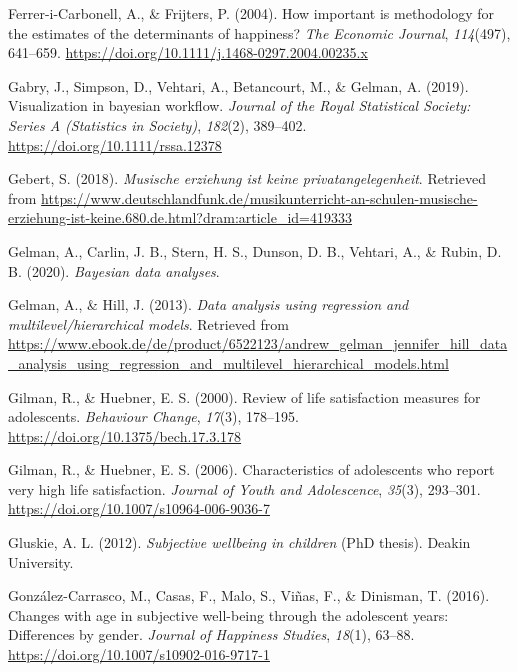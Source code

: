\documentclass[a4, 12pt]{article}
\begin{document}
\leavevmode\hypertarget{ref-iCarbonell2004}{}%
Ferrer-i-Carbonell, A., \& Frijters, P. (2004). How important is methodology for the estimates of the determinants of happiness? \emph{The Economic Journal}, \emph{114}(497), 641--659. \url{https://doi.org/10.1111/j.1468-0297.2004.00235.x}

\leavevmode\hypertarget{ref-Gabry2019}{}%
Gabry, J., Simpson, D., Vehtari, A., Betancourt, M., \& Gelman, A. (2019). Visualization in bayesian workflow. \emph{Journal of the Royal Statistical Society: Series A (Statistics in Society)}, \emph{182}(2), 389--402. \url{https://doi.org/10.1111/rssa.12378}

\leavevmode\hypertarget{ref-Gebert2018}{}%
Gebert, S. (2018). \emph{Musische erziehung ist keine privatangelegenheit}. Retrieved from \url{https://www.deutschlandfunk.de/musikunterricht-an-schulen-musische-erziehung-ist-keine.680.de.html?dram:article_id=419333}

\leavevmode\hypertarget{ref-Gelman}{}%
Gelman, A., Carlin, J. B., Stern, H. S., Dunson, D. B., Vehtari, A., \& Rubin, D. B. (2020). \emph{Bayesian data analyses}.

\leavevmode\hypertarget{ref-Gelman2013}{}%
Gelman, A., \& Hill, J. (2013). \emph{Data analysis using regression and multilevel/hierarchical models}. Retrieved from \url{https://www.ebook.de/de/product/6522123/andrew_gelman_jennifer_hill_data_analysis_using_regression_and_multilevel_hierarchical_models.html}

\leavevmode\hypertarget{ref-Gilman2000}{}%
Gilman, R., \& Huebner, E. S. (2000). Review of life satisfaction measures for adolescents. \emph{Behaviour Change}, \emph{17}(3), 178--195. \url{https://doi.org/10.1375/bech.17.3.178}

\leavevmode\hypertarget{ref-Gilman2006}{}%
Gilman, R., \& Huebner, E. S. (2006). Characteristics of adolescents who report very high life satisfaction. \emph{Journal of Youth and Adolescence}, \emph{35}(3), 293--301. \url{https://doi.org/10.1007/s10964-006-9036-7}

\leavevmode\hypertarget{ref-Gluskie2012}{}%
Gluskie, A. L. (2012). \emph{Subjective wellbeing in children} (PhD thesis). Deakin University.

\leavevmode\hypertarget{ref-GonzalezCarrasco2016}{}%
González-Carrasco, M., Casas, F., Malo, S., Viñas, F., \& Dinisman, T. (2016). Changes with age in subjective well-being through the adolescent years: Differences by gender. \emph{Journal of Happiness Studies}, \emph{18}(1), 63--88. \url{https://doi.org/10.1007/s10902-016-9717-1}
\end{document}
